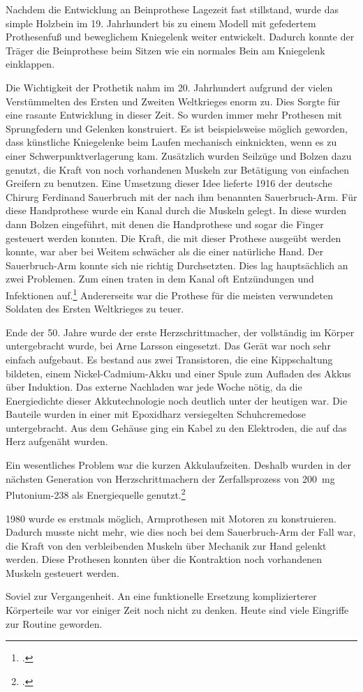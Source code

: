 Nachdem die Entwicklung an Beinprothese Lagezeit fast stillstand, wurde das simple Holzbein im 19.
Jahrhundert bis zu einem Modell mit gefedertem Prothesenfuß und beweglichem Kniegelenk weiter
entwickelt. Dadurch konnte der Träger die Beinprothese beim Sitzen wie ein normales Bein am
Kniegelenk einklappen.

Die Wichtigkeit der Prothetik nahm im 20. Jahrhundert aufgrund der vielen Verstümmelten des Ersten
und Zweiten Weltkrieges enorm zu. Dies Sorgte für eine rasante Entwicklung in dieser Zeit. So wurden
immer mehr Prothesen mit Sprungfedern und Gelenken konstruiert. Es ist beispielsweise möglich
geworden, dass künstliche Kniegelenke beim Laufen mechanisch einknickten, wenn es zu einer
Schwerpunktverlagerung kam. Zusätzlich wurden Seilzüge und Bolzen dazu genutzt, die Kraft von noch
vorhandenen Muskeln zur Betätigung von einfachen Greifern zu benutzen. Eine Umsetzung dieser Idee
lieferte 1916 der deutsche Chirurg Ferdinand Sauerbruch mit der nach ihm benannten Sauerbruch-Arm.
Für diese Handprothese wurde ein Kanal durch die Muskeln gelegt. In diese wurden dann Bolzen
eingeführt, mit denen die Handprothese und sogar die Finger gesteuert werden konnten. Die Kraft, die
mit dieser Prothese ausgeübt werden konnte, war aber bei Weitem schwächer als die einer natürliche
Hand. Der Sauerbruch-Arm konnte sich nie richtig Durchsetzten. Dies lag hauptsächlich an zwei
Problemen. Zum einen traten in dem Kanal oft Entzündungen und Infektionen
auf.\footcite{thesis:Karpa:Geschichte_Armprothesen}
Andererseits war die
Prothese für die meisten verwundeten Soldaten des Ersten Weltkrieges zu teuer.

Ende der 50. Jahre wurde der erste Herzschrittmacher, der vollständig im Körper untergebracht wurde,
bei Arne Larsson eingesetzt. Das Gerät war noch sehr einfach aufgebaut. Es bestand aus zwei
Transistoren, die eine Kippschaltung bildeten, einem Nickel-Cadmium-Akku und einer Spule zum
Aufladen des Akkus über Induktion. Das externe Nachladen war jede Woche nötig, da die Energiedichte
dieser Akkutechnologie noch deutlich unter der heutigen war. Die Bauteile wurden in einer mit
Epoxidharz versiegelten Schuhcremedose untergebracht. Aus dem Gehäuse ging ein Kabel zu den
Elektroden, die auf das Herz aufgenäht wurden.

Ein wesentliches Problem war die kurzen Akkulaufzeiten. Deshalb wurden in der nächsten Generation
von Herzschrittmachern der Zerfallsprozess von \SI{200}{\milli\gram} Plutonium-238 als Energiequelle
genutzt.\footcite{DRadio:strahlendes_Herz}

1980 wurde es erstmals möglich, Armprothesen mit Motoren zu konstruieren. Dadurch musste nicht mehr,
wie dies noch bei dem Sauerbruch-Arm der Fall war, die Kraft von den verbleibenden Muskeln über
Mechanik zur Hand gelenkt werden. Diese Prothesen konnten über die Kontraktion noch vorhandenen
Muskeln gesteuert werden.

\bigskip
Soviel zur Vergangenheit. An eine funktionelle Ersetzung komplizierterer Körperteile war vor einiger
Zeit noch nicht zu denken. Heute sind viele Eingriffe zur Routine geworden.